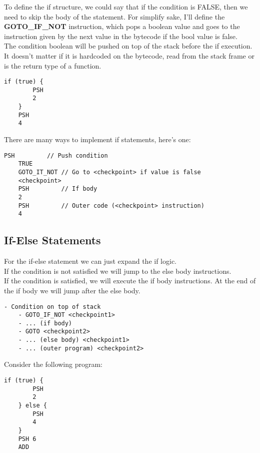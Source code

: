 \documentclass[../documentation.tex]{subfiles}
\begin{document}
To define the if structure, we could say that if the condition is FALSE, then we need to skip the body of the statement.
For simplify sake, I'll define the \textbf{GOTO\_IF\_NOT} instruction, which pops a boolean value and goes to the instruction
given by the next value in the bytecode if the bool value is false.
\\
The condition boolean will be pushed on top of the stack before the if execution. It doesn't matter if it is
hardcoded on the bytecode, read from the stack frame or is the return type of a function.

\begin{lstlisting}[style=generic]
    if (true) {
        PSH
        2
    }
    PSH
    4
\end{lstlisting}

There are many ways to implement if statements, here's one:

\begin{lstlisting}[style=generic]
    PSH         // Push condition
    TRUE
    GOTO_IT_NOT // Go to <checkpoint> if value is false
    <checkpoint>
    PSH         // If body
    2
    PSH         // Outer code (<checkpoint> instruction)
    4
\end{lstlisting}

\pagebreak

\subsection{If-Else Statements}

For the if-else statement we can just expand the if logic.
\\
If the condition is not satisfied we will jump to the else body instructions.
\\
If the condition is satisfied, we will execute the if body instructions. At the end of the if body
we will jump after the else body.

\begin{lstlisting}[style=generic]
    - Condition on top of stack
    - GOTO_IF_NOT <checkpoint1>
    - ... (if body)
    - GOTO <checkpoint2>
    - ... (else body) <checkpoint1>
    - ... (outer program) <checkpoint2>
\end{lstlisting}

Consider the following program:

\begin{lstlisting}[style=generic]
    if (true) {
        PSH
        2
    } else {
        PSH
        4
    }
    PSH 6
    ADD
\end{lstlisting}
\end{document}
